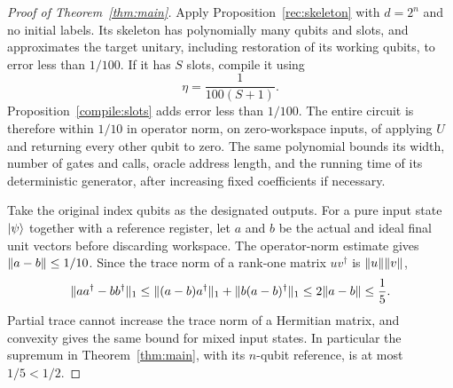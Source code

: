 \begin{proof}[Proof of Theorem~\ref{thm:main}]
Apply Proposition~\ref{rec:skeleton} with $d=2^n$ and no initial labels.
Its skeleton has polynomially many qubits and slots, and approximates the
target unitary, including restoration of its working qubits, to error
less than $1/100$. If it has $S$ slots, compile it using
\[
 \eta=\frac{1}{100(S+1)}.
\]
Proposition~\ref{compile:slots} adds error less than $1/100$. The entire
circuit is therefore within $1/10$ in operator norm, on zero-workspace
inputs, of applying $U$ and returning every other qubit to zero. The same
polynomial bounds its width, number of gates and calls, oracle address
length, and the running time of its deterministic generator, after
increasing fixed coefficients if necessary.

Take the original index qubits as the designated outputs. For a pure input
state $\lvert \psi\rangle$ together with a reference register, let $a$ and $b$ be the
actual and ideal final unit vectors before discarding workspace. The
operator-norm estimate gives $\lVert a-b\rVert\le1/10$. Since the trace norm of
a rank-one matrix $uv^\dagger$ is $\lVert u\rVert\lVert v\rVert$,
\[
 \lVert aa^\dagger-bb^\dagger\rVert_1
 \le\lVert (a-b)a^\dagger\rVert_1+\lVert b(a-b)^\dagger\rVert_1
 \le2\lVert a-b\rVert\le\frac15.
\]
Partial trace cannot increase the trace norm of a Hermitian matrix, and
convexity gives the same bound for mixed input states. In particular the
supremum in Theorem~\ref{thm:main}, with its $n$-qubit reference, is at most
$1/5<1/2$.
\end{proof}
